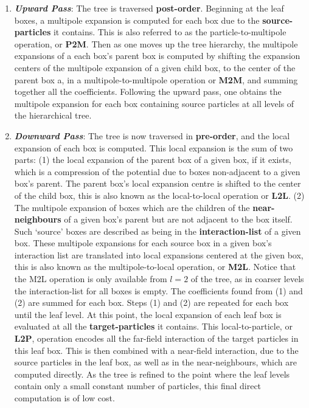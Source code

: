 \begin{enumerate}
    \item \textbf{\textit{Upward Pass}}: The tree is traversed \textbf{\gls{post-order}}.
    Beginning at the leaf boxes, a multipole expansion is computed for each box
    due to the \textbf{\gls{source-particles}} it contains. This is also referred to as the particle-to-multipole
    operation, or \textbf{\gls{P2M}}. Then as one moves up the tree hierarchy, the
    multipole expansions of a each box's parent box is computed by shifting the
    expansion centers of the multipole expansion of a given child box, to the center
    of the parent box a, in a multipole-to-multipole operation or \textbf{\gls{M2M}},
    and summing together all the coefficients. Following the upward pass, one
    obtains the multipole expansion for each box containing source particles at
    all levels of the hierarchical tree.
    \item \textbf{\textit{Downward Pass}}: The tree is now traversed in
    \textbf{\gls{pre-order}}, and the local expansion of each box is computed.
    This local expansion is the sum of two parts: (1) the local expansion of the
    parent box of a given box, if it exists, which is a compression of the potential due to boxes
    non-adjacent to a given box's parent. The parent box's local expansion centre
    is shifted to the center of the child box, this is also known as the local-to-local
    operation or \textbf{\gls{L2L}}. (2) The multipole expansion of boxes which
    are the children of the \textbf{\gls{near-neighbours}} of a given box's
    parent but are not adjacent to the box itself. Such `source' boxes are described
    as being in the \textbf{\gls{interaction-list}} of a given box. These multipole
    expansions for each source box in a given box's interaction list are translated into local expansions centered at
    the given box, this is also known as
    the multipole-to-local operation, or \textbf{\gls{M2L}}. Notice that the
    \gls{M2L} operation is only available from $l=2$ of the tree, as in coarser
    levels the \gls{interaction-list} for all boxes is empty. The coefficients found
    from (1) and (2) are summed for each box. Steps (1) and (2) are repeated for each
    box until the leaf level. At this point, the local expansion
    of each leaf box is evaluated at all the \textbf{\gls{target-particles}} it contains.
    This local-to-particle, or \textbf{\gls{L2P}}, operation encodes all the \gls{far-field}
    interaction of the target particles in this leaf box. This is then combined with
    a \gls{near-field} interaction, due to the source particles in the leaf box,
    as well as in the \gls{near-neighbours}, which are computed directly. As the
    tree is refined to the point where the leaf levels contain only a small constant
    number of particles, this final direct computation is of low cost.
\end{enumerate}


